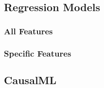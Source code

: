 \documentclass[12pt,letterpaper]{article}
\begin{document}
\subsection{Regression Models}\label{sec:reg}
\subsubsection{All Features}







\subsubsection{Specific Features}








\subsection{CausalML}


\clearpage
\end{document}
